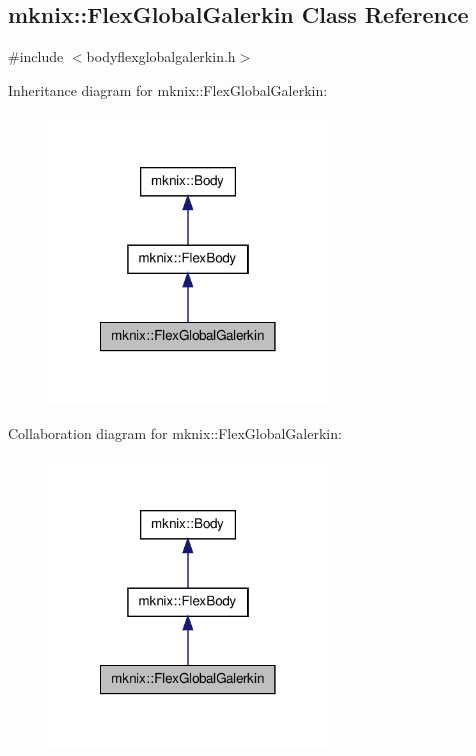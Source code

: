 \hypertarget{classmknix_1_1_flex_global_galerkin}{\subsection{mknix\-:\-:Flex\-Global\-Galerkin Class Reference}
\label{classmknix_1_1_flex_global_galerkin}
}


{\ttfamily \#include $<$bodyflexglobalgalerkin.\-h$>$}



Inheritance diagram for mknix\-:\-:Flex\-Global\-Galerkin\-:\nopagebreak
\begin{figure}[H]
\begin{center}
\leavevmode
\includegraphics[width=210pt]{d2/d2f/classmknix_1_1_flex_global_galerkin__inherit__graph}
\end{center}
\end{figure}


Collaboration diagram for mknix\-:\-:Flex\-Global\-Galerkin\-:\nopagebreak
\begin{figure}[H]
\begin{center}
\leavevmode
\includegraphics[width=210pt]{dd/ddb/classmknix_1_1_flex_global_galerkin__coll__graph}
\end{center}
\end{figure}
